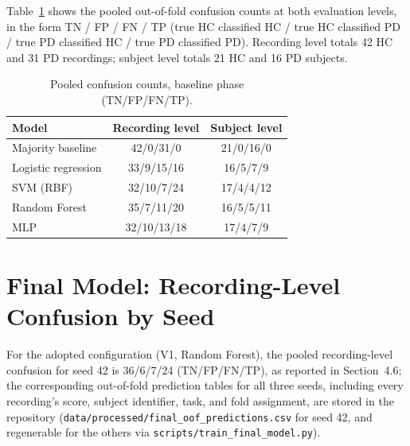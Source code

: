 Table~\ref{tab:confusions} shows the pooled out-of-fold confusion
counts at both evaluation levels, in the form
TN / FP / FN / TP (true HC classified HC / true HC classified PD /
true PD classified HC / true PD classified PD). Recording level
totals 42 HC and 31 PD recordings; subject level totals 21 HC and 16
PD subjects.

\begin{table}[htb]
\centering
\caption{Pooled confusion counts, baseline phase (TN/FP/FN/TP).}
\label{tab:confusions}
\begin{tabular}{lcc}
\toprule
Model & Recording level & Subject level \\
\midrule
Majority baseline   & 42/0/31/0  & 21/0/16/0 \\
Logistic regression & 33/9/15/16 & 16/5/7/9 \\
SVM (RBF)           & 32/10/7/24 & 17/4/4/12 \\
Random Forest       & 35/7/11/20 & 16/5/5/11 \\
MLP                 & 32/10/13/18 & 17/4/7/9 \\
\bottomrule
\end{tabular}
\end{table}

\section{Final Model: Recording-Level Confusion by Seed}

For the adopted configuration (V1, Random Forest), the pooled
recording-level confusion for seed 42 is 36/6/7/24 (TN/FP/FN/TP), as
reported in Section~4.6; the corresponding out-of-fold prediction
tables for all three seeds, including every recording's score, subject
identifier, task, and fold assignment, are stored in the repository
(\texttt{data/processed/final\_oof\_predictions.csv} for seed 42, and
regenerable for the others via
\texttt{scripts/train\_final\_model.py}).
